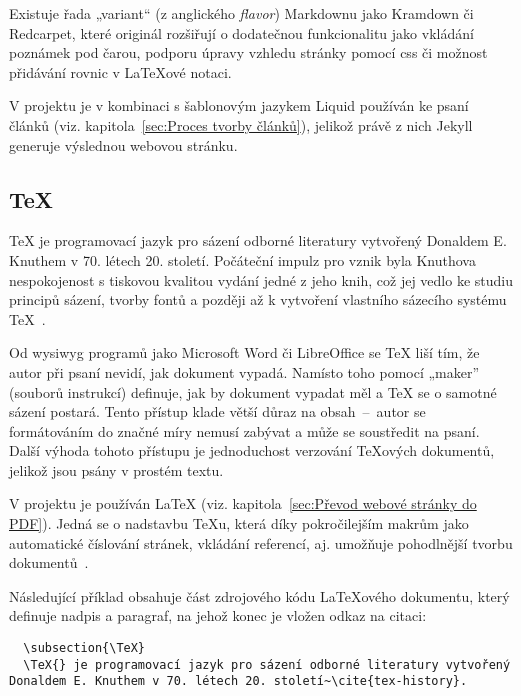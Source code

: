 \documentclass[a4paper, 12pt]{article}
\begin{document}
  Existuje řada „variant“ (z anglického \textit{flavor}) Markdownu jako Kramdown či Redcarpet, které originál rozšiřují o dodatečnou funkcionalitu jako vkládání poznámek pod čarou, podporu úpravy vzhledu stránky pomocí \gls{css} či možnost přidávání rovnic v \LaTeX ové notaci.

  V projektu je v kombinaci s šablonovým jazykem Liquid používán ke psaní článků (viz. kapitola~\ref{sec:Proces tvorby článků}), jelikož právě z nich Jekyll generuje výslednou webovou stránku.


  \subsection{\TeX} \label{sec:TeX}
  \TeX{} je programovací jazyk pro sázení odborné literatury vytvořený Donaldem E. Knuthem v 70. létech 20. století. Počáteční impulz pro vznik byla Knuthova nespokojenost s tiskovou kvalitou vydání jedné z jeho knih, což jej vedlo ke studiu principů sázení, tvorby fontů a později až k vytvoření vlastního sázecího systému \TeX{}~\cite{tex-history}.

  Od \gls{wysiwyg} programů jako Microsoft Word či LibreOffice se \TeX{} liší tím, že autor při psaní nevidí, jak dokument vypadá. Namísto toho pomocí „maker” (souborů instrukcí) definuje, jak by dokument vypadat měl a \TeX{} se o samotné sázení postará. Tento přístup klade větší důraz na obsah~--~autor se formátováním do značné míry nemusí zabývat a může se soustředit na psaní. Další výhoda tohoto přístupu je jednoduchost verzování \TeX ových dokumentů, jelikož jsou psány v prostém textu.

  V projektu je používán \LaTeX{} (viz. kapitola~\ref{sec:Převod webové stránky do PDF}). Jedná se o nadstavbu \TeX u, která díky pokročilejším makrům jako automatické číslování stránek, vkládání referencí, aj. umožňuje pohodlnější tvorbu dokumentů~\cite{getting-started-with-latex}.

  Následující příklad obsahuje část zdrojového kódu \LaTeX ového dokumentu, který definuje nadpis a paragraf, na jehož konec je vložen odkaz na citaci:

  \begin{verbatim}
  \subsection{\TeX}
  \TeX{} je programovací jazyk pro sázení odborné literatury vytvořený Donaldem E. Knuthem v 70. létech 20. století~\cite{tex-history}.
  \end{verbatim}
\end{document}

